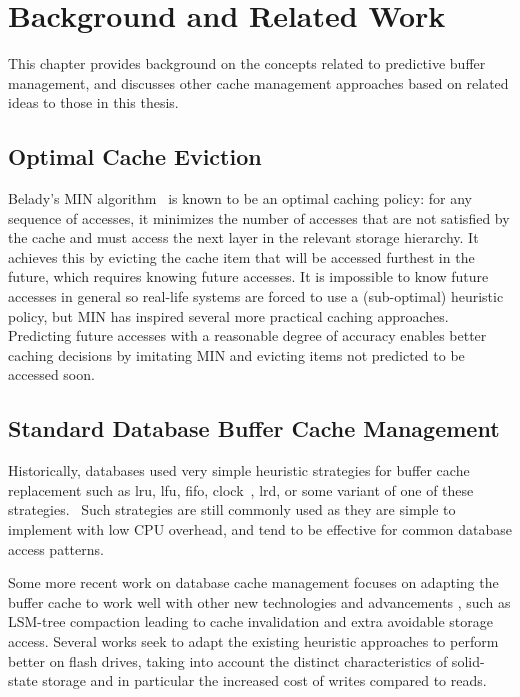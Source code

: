
\chapter{Background and Related Work}
\label{ch:background}

This chapter provides background on the concepts related to predictive buffer management, and discusses other cache management approaches based on related ideas to those in this thesis.

\section{Optimal Cache Eviction}

Belady's MIN algorithm~\cite{beladyMIN} is known to be an optimal caching policy: for any sequence of accesses, it minimizes the number of accesses that are not satisfied by the cache and must access the next layer in the relevant storage hierarchy. It achieves this by evicting the cache item that will be accessed furthest in the future, which requires knowing future accesses. It is impossible to know future accesses in general so real-life systems are forced to use a (sub-optimal) heuristic policy, but MIN has inspired several more practical caching approaches. Predicting future accesses with a reasonable degree of accuracy enables better caching decisions by imitating MIN and evicting items not predicted to be accessed soon.


\section{Standard Database Buffer Cache Management}

Historically, databases used very simple heuristic strategies for buffer cache replacement such as \gls{lru}, \gls{lfu}, \gls{fifo}, clock~\cite{gclock}, \gls{lrd}, or some variant of one of these strategies.~\cite{effelsberg1984principles,hull1988buffer,feng1998study} Such strategies are still commonly used as they are simple to implement with low CPU overhead, and tend to be effective for common database access patterns.

Some more recent work on database cache management focuses on adapting the buffer cache to work well with other new technologies and advancements \cite{teng2017lsbm}, such as LSM-tree compaction leading to cache invalidation and extra avoidable storage access. Several works seek to adapt the existing heuristic approaches to perform better on flash drives, taking into account the distinct characteristics of solid-state storage and in particular the increased cost of writes compared to reads. \cite{ou2009cfdc,lv2011operation,jiang2015cost,hu2010pud,jin2012ad}



